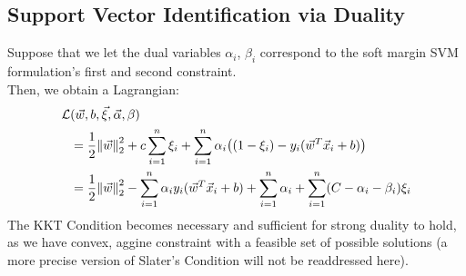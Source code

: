 \subsection{Support Vector Identification via Duality}
Suppose that we let the dual variables $\alpha_i$, $\beta_i$ correspond to the soft margin SVM formulation's first and second constraint. \\
Then, we obtain a Lagrangian:
\begin{align*}
    \mathcal{L} &(\vec{w}, b, \vec{\xi}, \vec{\alpha}, \beta) \\
    &= \frac{1}{2} \pnorm[2]{\vec{w}}{2} + c \sum_{i = 1}^n \xi_i + \sum_{i = 1}^n \alpha_i \big( (1 - \xi_i) - y_i (\vec{w}^T \vec{x}_i + b) \big) \\
    &= \frac{1}{2} \pnorm[2]{\vec{w}}{2} - \sum_{i=1}^n \alpha_i y_i (\vec{w}^T \vec{x}_i + b) + \sum_{i = 1}^n \alpha_i + \sum_{i = 1}^n (C - \alpha_i - \beta_i) \xi_i
\end{align*}
The KKT Condition becomes necessary and sufficient for strong duality to hold, as we have convex, aggine constraint with a feasible set of possible solutions (a more precise version of Slater's Condition will not be readdressed here).

